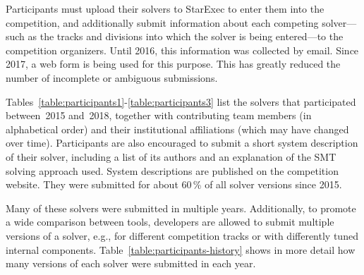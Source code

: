 \documentclass[dvipsnames,table,twoside,11pt]{article}
\begin{document}
Participants must upload their solvers to StarExec to enter them into
the competition, and additionally submit information about each
competing solver---such as the tracks and divisions into which the
solver is being entered---to the competition organizers.  Until 2016,
this information was collected by email.  Since 2017, a web form is
being used for this purpose.  This has greatly reduced the number of
incomplete or ambiguous submissions.

Tables~\ref{table:participants1}-\ref{table:participants3} list the solvers
that participated between~2015 and~2018, together with contributing team
members (in alphabetical order) and their institutional affiliations (which may
have changed over time).
%
Participants are also encouraged to submit a short system description
of their solver, including a list of its authors and an explanation of
the SMT solving approach used.  System descriptions are published on
the competition website.  They were submitted for about 60\,\% of all
solver versions since 2015.



Many of these solvers were submitted in multiple years.  Additionally,
to promote a wide comparison between tools, developers are allowed to
submit multiple versions of a solver, e.g., for different competition
tracks or with differently tuned internal components.
Table~\ref{table:participants-history} shows in more detail how many
versions of each solver were submitted in each year.
\end{document}
